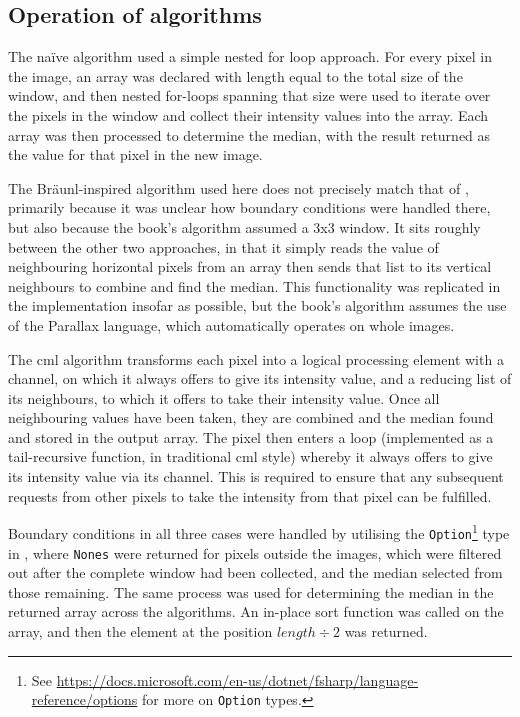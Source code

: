 \subsection{Operation of algorithms}
The naïve algorithm used a simple nested for loop approach.  For every pixel in the image, an array was declared with length equal to the total size of the window, and then nested for-loops spanning that size were used to iterate over the pixels in the window and collect their intensity values into the array.  Each array was then processed to determine the median, with the result returned as the value for that pixel in the new image.

The Bräunl-inspired algorithm used here does not precisely match that of \cite{Braunl2001}, primarily because it was unclear how boundary conditions were handled there, but also because the book's algorithm assumed a 3x3 window.  It sits roughly between the other two approaches, in that it simply reads the value of neighbouring horizontal pixels from an array then sends that list to its vertical neighbours to combine and find the median.  This functionality was replicated in the implementation insofar as possible, but the book's algorithm assumes the use of the Parallax language, which automatically operates on whole images.

The \gls{cml} algorithm transforms each pixel into a logical processing element with a channel, on which it always offers to give its intensity value, and a reducing list of its neighbours, to which it offers to take their intensity value.  Once all neighbouring values have been taken, they are combined and the median found and stored in the output array.  The pixel then enters a loop (implemented as a tail-recursive function, in traditional \gls{cml} style) whereby it always offers to give its intensity value via its channel.  This is required to ensure that any subsequent requests from other pixels to take the intensity from that pixel can be fulfilled.

Boundary conditions in all three cases were handled by utilising the \texttt{Option}\footnote{See \url{https://docs.microsoft.com/en-us/dotnet/fsharp/language-reference/options} for more on \texttt{Option} types.} type in \fsharp{}, where \texttt{Nones} were returned for pixels outside the images, which were filtered out after the complete window had been collected, and the median selected from those remaining.  The same process was used for determining the median in the returned array across the algorithms.  An in-place sort function was called on the array, and then the element at the position $length \div 2$ was returned.

